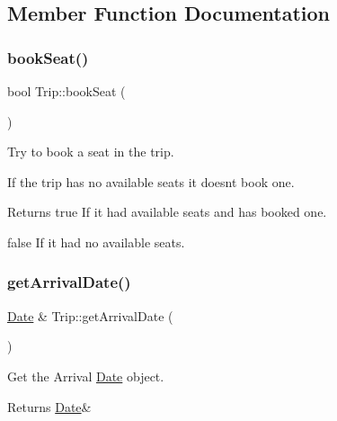 \subsection{Member Function Documentation}
\mbox{\label{classTrip_a00e2b65d40562051bfe4124f581a49e1}} 
\subsubsection{\texorpdfstring{book\+Seat()}{bookSeat()}}
{\footnotesize\ttfamily bool Trip\+::book\+Seat (\begin{DoxyParamCaption}{ }\end{DoxyParamCaption})}



Try to book a seat in the trip. 

If the trip has no available seats it doesn\textquotesingle{}t book one.

\begin{DoxyReturn}{Returns}
true If it had available seats and has booked one. 

false If it had no available seats. 
\end{DoxyReturn}
\mbox{\label{classTrip_a821dfd23e37c28f1c0a2dab3f2836799}} 
\subsubsection{\texorpdfstring{get\+Arrival\+Date()}{getArrivalDate()}}
{\footnotesize\ttfamily \mbox{\hyperlink{classDate}{Date}} \& Trip\+::get\+Arrival\+Date (\begin{DoxyParamCaption}{ }\end{DoxyParamCaption})}



Get the Arrival \mbox{\hyperlink{classDate}{Date}} object. 

\begin{DoxyReturn}{Returns}
\mbox{\hyperlink{classDate}{Date}}\& 
\end{DoxyReturn}
\mbox{\label{classTrip_af2a3a9f9e33b9dd31e9193cf48bec134}} 
